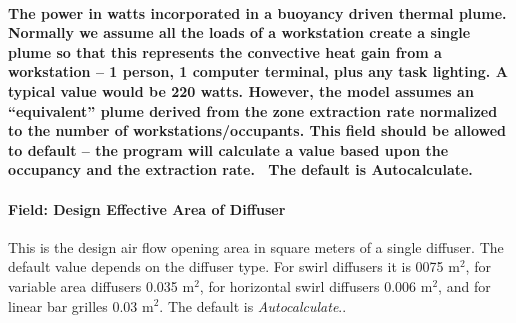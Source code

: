 \paragraph{\texorpdfstring{The power in watts incorporated in a buoyancy driven thermal plume. Normally we assume all the loads of a workstation create a single plume so that this represents the convective heat gain from a workstation -- 1 person, 1 computer terminal, plus any task lighting. A typical value would be 220 watts. However, the model assumes an ``equivalent'' plume derived from the zone extraction rate normalized to the number of workstations/occupants. This field should be allowed to default -- the program will calculate a value based upon the occupancy and the extraction rate.~ The default is Autocalculate.}{The power in watts incorporated in a buoyancy driven thermal plume. Normally we assume all the loads of a workstation create a single plume so that this represents the convective heat gain from a workstation -- 1 person, 1 computer terminal, plus any task lighting. A typical value would be 220 watts. However, the model assumes an equivalent plume derived from the zone extraction rate normalized to the number of workstations/occupants. This field should be allowed to default -- the program will calculate a value based upon the occupancy and the extraction rate.~ The default is Autocalculate.}}\label{the-power-in-watts-incorporated-in-a-buoyancy-driven-thermal-plume.-normally-we-assume-all-the-loads-of-a-workstation-create-a-single-plume-so-that-this-represents-the-convective-heat-gain-from-a-workstation-1-person-1-computer-terminal-plus-any-task-lighting.-a-typical-value-would-be-220-watts.-however-the-model-assumes-an-equivalent-plume-derived-from-the-zone-extraction-rate-normalized-to-the-number-of-workstationsoccupants.-this-field-should-be-allowed-to-default-the-program-will-calculate-a-value-based-upon-the-occupancy-and-the-extraction-rate.-the-default-is-autocalculate.}

\paragraph{Field: Design Effective Area of Diffuser}\label{field-design-effective-area-of-diffuser-1}

This is the design air flow opening area in square meters of a single diffuser. The default value depends on the diffuser type. For swirl diffusers it is 0075 m\(^{2}\), for variable area diffusers 0.035 m\(^{2}\), for horizontal swirl diffusers 0.006 m\(^{2}\), and for linear bar grilles 0.03 m\(^{2}\). The default is \emph{Autocalculate}..

